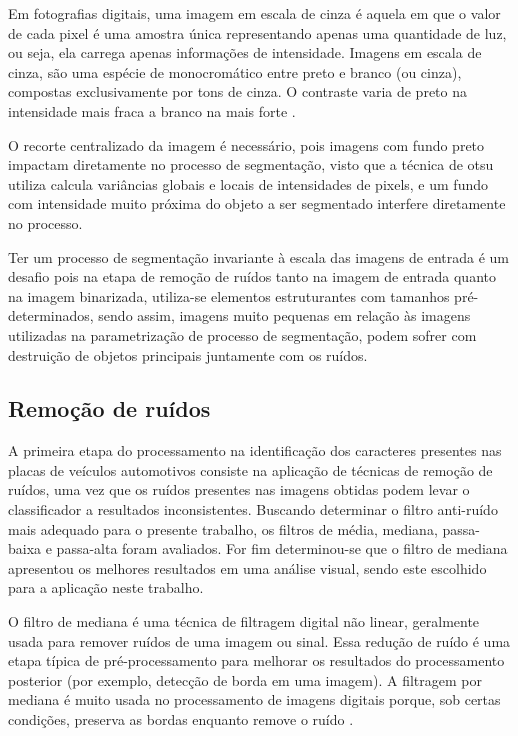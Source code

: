 \documentclass[
	12pt,				%
    oneside,			%
	a4paper,			%
	english,			%
	french,				%
	spanish,			%
	brazil,				%
	]{abntex2}
\begin{document}
Em fotografias digitais, uma imagem em escala de cinza é aquela em que o valor de cada pixel é uma amostra única representando apenas uma quantidade de luz, ou seja, ela carrega apenas informações de intensidade. Imagens em escala de cinza, são uma espécie de monocromático entre preto e branco (ou cinza), compostas exclusivamente por tons de cinza. O contraste varia de preto na intensidade mais fraca a branco na mais forte \cite{johnson2006}.



O recorte centralizado da imagem é necessário, pois imagens com fundo preto impactam diretamente no processo de segmentação, visto que a técnica de otsu utiliza calcula variâncias globais e locais de intensidades de pixels, e um fundo com intensidade muito próxima do objeto a ser segmentado interfere diretamente no processo.


Ter um processo de segmentação invariante à escala das imagens de entrada é um desafio pois na etapa de remoção de ruídos tanto na imagem de entrada quanto na imagem binarizada, utiliza-se elementos estruturantes com tamanhos pré-determinados, sendo assim, imagens muito pequenas em relação às imagens utilizadas na parametrização de processo de segmentação, podem sofrer com destruição de objetos principais juntamente com os ruídos.

\subsection{Remoção de ruídos}

A primeira etapa do processamento na identificação dos caracteres presentes nas placas de veículos automotivos consiste na aplicação de técnicas de remoção de ruídos, uma vez que os ruídos presentes nas imagens obtidas podem levar o classificador a resultados inconsistentes. Buscando determinar o filtro anti-ruído mais adequado para o presente trabalho, os filtros de média, mediana, passa-baixa e passa-alta foram avaliados. For fim determinou-se que o filtro de mediana apresentou os melhores resultados em uma análise visual, sendo este escolhido para a aplicação neste trabalho.

O filtro de mediana é uma técnica de filtragem digital não linear, geralmente usada para remover ruídos de uma imagem ou sinal. Essa redução de ruído é uma etapa típica de pré-processamento para melhorar os resultados do processamento posterior (por exemplo, detecção de borda em uma imagem). A filtragem por mediana é muito usada no processamento de imagens digitais porque, sob certas condições, preserva as bordas enquanto remove o ruído \cite{huang1979}.
\end{document}
